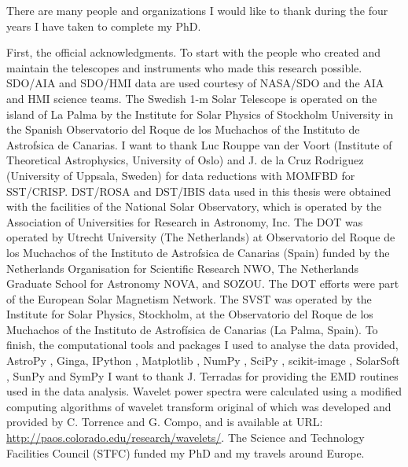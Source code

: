 \begin{acknowledgements}      
    
    There are many people and organizations I would like to thank during the four years I have taken to complete my PhD.
    
    First, the official acknowledgments.
    To start with the people who created and maintain the telescopes and instruments who made this research possible.
    SDO/AIA and SDO/HMI data are used courtesy of NASA/SDO and the AIA and HMI science teams.
    The Swedish 1-m Solar Telescope is operated on the island of La Palma by the Institute for Solar Physics of Stockholm University in the Spanish Observatorio del Roque de los Muchachos of the Instituto de Astrofsica de Canarias.
    I want to thank Luc Rouppe van der Voort (Institute of Theoretical Astrophysics, University of Oslo) and J. de la Cruz Rodriguez (University of Uppsala, Sweden) for data reductions with MOMFBD for SST/CRISP.
    DST/ROSA and DST/IBIS data used in this thesis were obtained with the facilities of the National Solar Observatory, which is operated by the Association of Universities for Research in Astronomy, Inc.
    The DOT was operated by Utrecht University (The Netherlands) at Observatorio del Roque de los Muchachos of the Instituto de Astrofsica de Canarias (Spain) funded by the Netherlands Organisation for Scientific Research NWO, The Netherlands Graduate School for Astronomy NOVA, and SOZOU.
    The DOT efforts were part of the European Solar Magnetism Network.
    The SVST was operated by the Institute for Solar Physics, Stockholm, at the Observatorio del Roque de los Muchachos of the Instituto de Astrofísica de Canarias (La Palma, Spain).
    To finish, the computational tools and packages I used to analyse the data provided, AstroPy \citep{theastropycollaboration2013}, Ginga, IPython \citep{perez2007}, Matplotlib \citep{hunter2007}, NumPy \citep{jones2001}, SciPy \citep{jones2001}, scikit-image \citep{vanderwalt2014}, SolarSoft \citep{1998SoPh..182..497F}, SunPy \citep{thesunpycommunity2015a} and SymPy \cite{sympydevelopmentteam2014}
    I want to thank J. Terradas for providing the EMD routines used in the data analysis.
    Wavelet power spectra were calculated using a modified computing algorithms of wavelet transform original of which was developed and provided by C. Torrence and G. Compo, and is available at URL: \url{http://paos.colorado.edu/research/wavelets/}.
    The Science and Technology Facilities Council (STFC) funded my PhD and my travels around Europe.
    

\end{acknowledgements}
